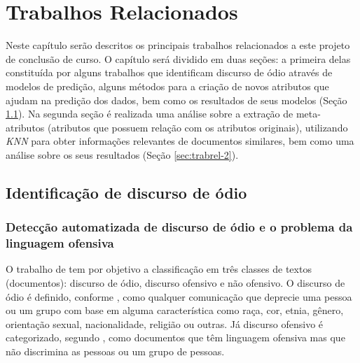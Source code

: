 \chapter{Trabalhos Relacionados}\label{cap:trabrel}

Neste capítulo serão descritos os principais trabalhos relacionados a este projeto de conclusão de curso.
O capítulo será dividido em duas seções: a primeira delas constituída por alguns trabalhos que identificam discurso de ódio através de modelos de predição, alguns métodos para a criação de novos atributos que ajudam na predição dos dados, bem como os resultados de seus modelos (Seção \ref{sec:trabrel-1}). Na segunda seção é realizada uma análise sobre a extração de meta-atributos (atributos que possuem relação com os atributos originais), utilizando \textit{KNN} para obter informações relevantes de documentos similares, bem como uma análise sobre os seus resultados (Seção \ref{sec:trabrel-2}).

\section{Identificação de discurso de ódio}\label{sec:trabrel-1}

\subsection{Detecção automatizada de discurso de ódio e o problema da linguagem ofensiva}\label{sec:trabrel-1.1}

O trabalho de \cite{davidson2017automated} tem por objetivo a classificação em três classes de textos (documentos): discurso de ódio, discurso ofensivo e não ofensivo. O discurso de ódio é definido, conforme \cite{nockleby2000hate}, como qualquer comunicação que deprecie uma pessoa ou um grupo com base em alguma característica como raça, cor, etnia, gênero, orientação sexual, nacionalidade, religião ou outras. Já discurso ofensivo é categorizado, segundo \cite{davidson2017automated}, como documentos que têm linguagem ofensiva mas que não discrimina as pessoas ou um grupo de pessoas.

